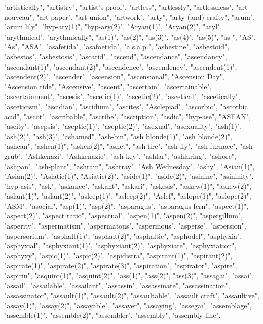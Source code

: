 "artistically",
"artistry",
"artist's proof",
"artless",
"artlessly",
"artlessness",
"art nouveau",
"art paper",
"art union",
"artwork",
"arty",
"arty-(and)-crafty",
"arum",
"arum lily",
"hyp-ary(1)",
"hyp-ary(2)",
"Aryan(1)",
"Aryan(2)",
"aryl",
"arythmical",
"arythmically",
"as(1)",
"as(2)",
"as(3)",
"as(4)",
"as(5)",
"as-",
"AS",
"As",
"ASA",
"asafetida",
"asafoetida",
"a.s.a.p.",
"asbestine",
"asbestoid",
"asbestos",
"asbestosis",
"ascarid",
"ascend",
"ascendance",
"ascendancy",
"ascendant(1)",
"ascendant(2)",
"ascendence",
"ascendency",
"ascendent(1)",
"ascendent(2)",
"ascender",
"ascension",
"ascensional",
"Ascension Day",
"Ascension tide",
"Ascensive",
"ascent",
"ascertain",
"ascertainable",
"ascertainment",
"ascesis",
"ascetic(1)",
"ascetic(2)",
"ascetical",
"ascetically",
"asceticism",
"ascidian",
"ascidium",
"ascites",
"Asclepiad",
"ascorbic",
"ascorbic acid",
"ascot",
"ascribable",
"ascribe",
"ascription",
"asdic",
"hyp-ase",
"ASEAN",
"aseity",
"asepsis",
"aseptic(1)",
"aseptic(2)",
"asexual",
"asexuality",
"ash(1)",
"ash(2)",
"ash(3)",
"ashamed",
"ash-bin",
"ash blonde(1)",
"ash blonde(2)",
"ashcan",
"ashen(1)",
"ashen(2)",
"ashet",
"ash-fire",
"ash fly",
"ash-furnace",
"ash grub",
"Ashkenazi",
"Ashkenazic",
"ash-key",
"ashlar",
"ashlaring",
"ashore",
"ashpan",
"ash-plant",
"ashram",
"ashtray",
"Ash Wednesday",
"ashy",
"Asian(1)",
"Asian(2)",
"Asiatic(1)",
"Asiatic(2)",
"aside(1)",
"aside(2)",
"asinine",
"asininity",
"hyp-asis",
"ask",
"askance",
"askant",
"askari",
"askesis",
"askew(1)",
"askew(2)",
"aslant(1)",
"aslant(2)",
"asleep(1)",
"asleep(2)",
"Aslef",
"aslope(1)",
"aslope(2)",
"ASM",
"asocial",
"asp(1)",
"asp(2)",
"asparagus",
"asparagus fern",
"aspect(1)",
"aspect(2)",
"aspect ratio",
"aspectual",
"aspen(1)",
"aspen(2)",
"aspergillum",
"asperity",
"aspermatism",
"aspermatous",
"aspermous",
"asperse",
"aspersion",
"aspersorium",
"asphalt(1)",
"asphalt(2)",
"asphaltic",
"asphodel",
"asphyxia",
"asphyxial",
"asphyxiant(1)",
"asphyxiant(2)",
"asphyxiate",
"asphyxiation",
"asphyxy",
"aspic(1)",
"aspic(2)",
"aspidistra",
"aspirant(1)",
"aspirant(2)",
"aspirate(1)",
"aspirate(2)",
"aspirate(3)",
"aspiration",
"aspirator",
"aspire",
"aspirin",
"asquint(1)",
"asquint(2)",
"ass(1)",
"ass(2)",
"ass(3)",
"assagai",
"assai",
"assail",
"assailable",
"assailant",
"assassin",
"assassinate",
"assassination",
"assassinator",
"assault(1)",
"assault(2)",
"assaultable",
"assault craft",
"assaultive",
"assay(1)",
"assay(2)",
"assayable",
"assayer",
"assaying",
"assegai",
"assemblage",
"assemble(1)",
"assemble(2)",
"assembler",
"assembly",
"assembly line",
